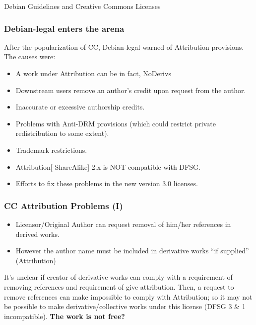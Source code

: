 
\begin{frame}
\begin{center}
\huge{Debian Guidelines and Creative Commons Licenses}
\end{center}

\end{frame}



\begin{frame}
\frametitle{Debian-legal enters the arena}

After the popularization of CC, Debian-legal warned of
Attribution provisions. The causes were:

\begin{itemize}
\item A work under Attribution can be in fact, NoDerivs 
\item Downstream users remove an author's credit upon request from the author.
\item Inaccurate or excessive authorship credits.
\item Problems with Anti-DRM provisions (which could restrict private redistribution to some extent).
\item Trademark restrictions.
\item Attribution[-ShareAlike] 2.x is NOT compatible with DFSG. 
\item Efforts to fix these problems in the new version 3.0 licenses.

\end{itemize}


\end{frame}




\begin{frame}
\frametitle{CC Attribution Problems (I)}

\begin{itemize}
\item Licensor/Original Author can request removal of him/her references in derived works.
\item However the author name must be included in derivative works ``if supplied'' (Attribution)
\end{itemize}

It's unclear if creator of derivative works can comply with a requirement of removing references and requirement of give attribution. Then, a request to remove references can make impossible to comply with Attribution; so it may not be possible to make derivative/collective works under this license (DFSG 3 \& 1 incompatible). {\bf The work is not free?}

\end{frame}


